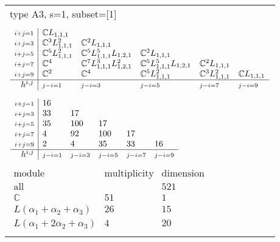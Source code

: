 \documentclass[crop,border=2mm]{standalone}
\begin{document}
\begin{tabular}{l}
{\huge type A3, s=1, subset=[1]}\\ \\


$\displaystyle
\begin{array}{r|l l l l l}
	{\scriptstyle i+j=1}&\mathbb{C}L_{1,1,1}&&&&\\
	{\scriptstyle i+j=3}&\mathbb{C}^{3}L_{1,1,1}^{2}&\mathbb{C}^{2}L_{1,1,1}&&&\\
	{\scriptstyle i+j=5}&\mathbb{C}^{5}L_{1,1,1}^{2}&\mathbb{C}^{5}L_{1,1,1}^{5}L_{1,2,1}&\mathbb{C}^{2}L_{1,1,1}&&\\
	{\scriptstyle i+j=7}&\mathbb{C}^{4}&\mathbb{C}^{7}L_{1,1,1}^{3}L_{1,2,1}^{2}&\mathbb{C}^{5}L_{1,1,1}^{5}L_{1,2,1}&\mathbb{C}^{2}L_{1,1,1}&\\
	{\scriptstyle i+j=9}&\mathbb{C}^{2}&\mathbb{C}^{4}&\mathbb{C}^{5}L_{1,1,1}^{2}&\mathbb{C}^{3}L_{1,1,1}^{2}&\mathbb{C}L_{1,1,1}\\
	\hline h^{i,j}&{\scriptstyle j-i=1}&{\scriptstyle j-i=3}&{\scriptstyle j-i=5}&{\scriptstyle j-i=7}&{\scriptstyle j-i=9}
\end{array}
$ \\ \\


$\displaystyle
\begin{array}{r|l l l l l}
	{\scriptstyle i+j=1}&16&&&&\\
	{\scriptstyle i+j=3}&33&17&&&\\
	{\scriptstyle i+j=5}&35&100&17&&\\
	{\scriptstyle i+j=7}&4&92&100&17&\\
	{\scriptstyle i+j=9}&2&4&35&33&16\\
	\hline h^{i,j}&{\scriptstyle j-i=1}&{\scriptstyle j-i=3}&{\scriptstyle j-i=5}&{\scriptstyle j-i=7}&{\scriptstyle j-i=9}
\end{array}
$ \\ \\


$\displaystyle
\begin{array}{rll}
	\text{module}&\text{multiplicity}&\text{dimension} \\ \hline \text{all}&&521 \\
	\mathbb{C}&51&1\\
	L\left(\alpha_{1}+\alpha_{2}+\alpha_{3}\right)&26&15\\
	L\left(\alpha_{1}+ 2\alpha_{2}+\alpha_{3}\right)&4&20
\end{array}
$ \\ \\

\end{tabular}
\end{document}
